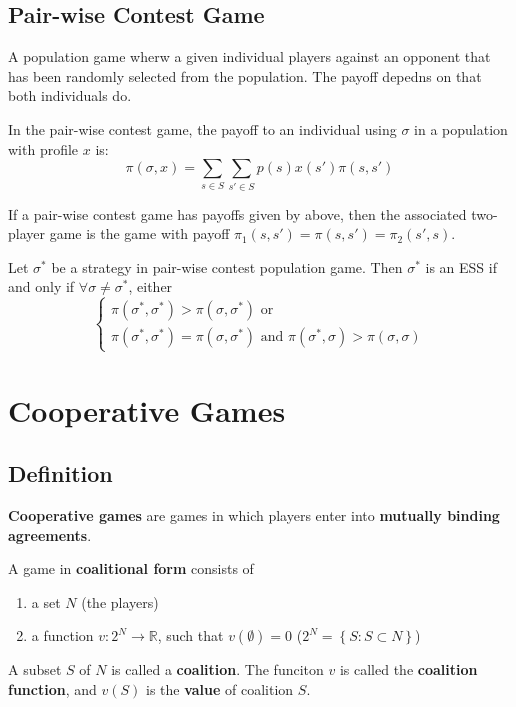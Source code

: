 \documentclass[11pt,a4paper]{article}
\begin{document}
\subsection{Pair-wise Contest Game}
A population game wherw a given individual players against an opponent that has been randomly selected from the population. The payoff depedns on that both individuals do. \par
In the pair-wise contest game, the payoff to an individual using $\sigma$ in a population with profile $x$ is:
\[
\pi(\sigma, x) = \sum_{s \in S} \sum_{s' \in S} p(s) x(s') \pi(s, s') 
\]

If a pair-wise contest game has payoffs given by above, then the associated two-player game is the game with payoff $\pi_1(s, s') = \pi(s, s') = \pi_2(s', s)$.

Let $\sigma^*$ be a strategy in pair-wise contest population game. Then $\sigma^*$ is an ESS if and only if $\forall \sigma \neq \sigma^*$, either
\[
\begin{cases}
    \pi(\sigma^*, \sigma^*) > \pi(\sigma, \sigma^*) \text{ or} \\
    \pi(\sigma^*, \sigma^*) = \pi(\sigma, \sigma^*) \text{ and } \pi(\sigma^*, \sigma) > \pi(\sigma, \sigma)
\end{cases}
\]

\section{Cooperative Games}
\subsection{Definition}
\textbf{Cooperative games} are games in which players enter into \textbf{mutually binding agreements}. \par

A game in \textbf{coalitional form} consists of
\begin{enumerate}
    \item [1. ] a set $N$ (the players)
    \item [2. ] a function $v : 2^N \rightarrow \mathbb{R}$, such that $v(\emptyset) = 0$ ($2^N = \left\{S : S \subset N\right\}$)
\end{enumerate}

A subset $S$ of $N$ is called a \textbf{coalition}. The funciton $v$ is called the \textbf{coalition function}, and $v(S)$ is the \textbf{value} of coalition $S$. \par
\end{document}
